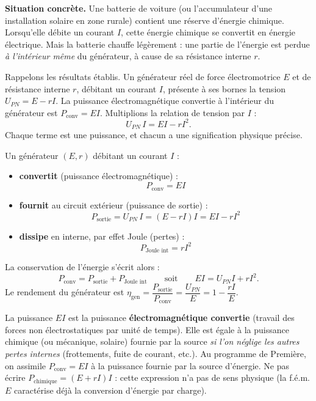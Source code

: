 \documentclass[11pt]{article}
\newcounter{popsec}
\newcounter{popsub}
\newcommand{\courssub}[1]{%
  \stepcounter{popsub}%
  \par\vspace{9pt}\noindent{\popxbold\fontsize{11.5}{13}\selectfont\color{popink}{\color{poporange}\thepopsec.\thepopsub}\hspace{6pt}#1}\par\nopagebreak\vspace{4pt}
}
\begin{document}
\courssub{Le bilan du générateur}

\textbf{Situation concrète.} Une batterie de voiture (ou l'accumulateur d'une installation solaire en zone rurale) contient une réserve d'énergie chimique. Lorsqu'elle débite un courant $I$, cette énergie chimique se convertit en énergie électrique. Mais la batterie chauffe légèrement : une partie de l'énergie est perdue \emph{à l'intérieur même} du générateur, à cause de sa résistance interne $r$.

Rappelons les résultats établis. Un générateur réel de force électromotrice $E$ et de résistance interne $r$, débitant un courant $I$, présente à ses bornes la tension $U_{PN} = E - rI$. La puissance électromagnétique convertie à l'intérieur du générateur est $P_{\text{conv}} = EI$. Multiplions la relation de tension par $I$ :
\[ U_{PN}\,I = EI - rI^2. \]
Chaque terme est une puissance, et chacun a une signification physique précise.

\begin{propriete}
Un générateur $(E, r)$ débitant un courant $I$ :
\begin{itemize}
\item \textbf{convertit} (puissance électromagnétique) :
\[ P_{\text{conv}} = EI \]
\item \textbf{fournit} au circuit extérieur (puissance de sortie) :
\[ P_{\text{sortie}} = U_{PN}\,I = (E - rI)I = EI - rI^2 \]
\item \textbf{dissipe} en interne, par effet Joule (pertes) :
\[ P_{\text{Joule int}} = rI^2 \]
\end{itemize}
La conservation de l'énergie s'écrit alors :
\[ \boxed{P_{\text{conv}} = P_{\text{sortie}} + P_{\text{Joule int}}} \qquad\text{soit}\qquad EI = U_{PN}I + rI^2. \]
Le rendement du générateur est $\eta_{\text{gen}} = \dfrac{P_{\text{sortie}}}{P_{\text{conv}}} = \dfrac{U_{PN}}{E} = 1 - \dfrac{rI}{E}$.
\end{propriete}

\begin{attention}
La puissance $EI$ est la puissance \textbf{électromagnétique convertie} (travail des forces non électrostatiques par unité de temps). Elle est égale à la puissance chimique (ou mécanique, solaire) fournie par la source \emph{si l'on néglige les autres pertes internes} (frottements, fuite de courant, etc.). Au programme de Première, on assimile $P_{\text{conv}} = EI$ à la puissance fournie par la source d'énergie. Ne pas écrire $P_{\text{chimique}} = (E+rI)I$ : cette expression n'a pas de sens physique (la f.é.m. $E$ caractérise déjà la conversion d'énergie par charge).
\end{attention}
\end{document}
